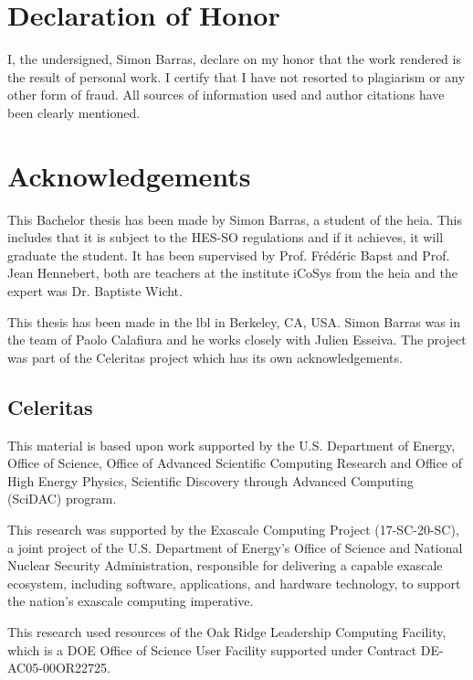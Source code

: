 \chapter{Declaration of Honor}
\label{ch:honour}
I, the undersigned, Simon Barras, declare on my honor that the work rendered is the result of
personal work. I certify that I have not resorted to plagiarism or any other form of fraud.
All sources of information used and author citations have been clearly mentioned.



\chapter{Acknowledgements}
\label{ch:remerciement}

This Bachelor thesis has been made by Simon Barras, a student of the \acrlong{heia}.
This includes that it is subject to the HES-SO regulations and if it achieves, it
will graduate the student.
It has been supervised by Prof. Frédéric Bapst and Prof. Jean Hennebert, both
are teachers at the institute iCoSys from the \acrshort{heia} and the expert was Dr. Baptiste Wicht.

This thesis has been made in the \acrlong{lbl} in Berkeley, CA, USA.
Simon Barras was in the team of Paolo Calafiura and he works closely with Julien
Esseiva.
The project was part of the Celeritas project which has its own acknowledgements.

\section{Celeritas}
\label{ch:acknowledgements:celeritas}

This material is based upon work supported by the U.S. Department of Energy,
Office of Science, Office of Advanced Scientific Computing Research and Office
of High Energy Physics, Scientific Discovery through Advanced Computing (SciDAC)
program.

This research was supported by the Exascale Computing Project (17-SC-20-SC), a
joint project of the U.S. Department of Energy's Office of Science and National
Nuclear Security Administration, responsible for delivering a capable exascale
ecosystem, including software, applications, and hardware technology, to support
the nation's exascale computing imperative.

This research used resources of the Oak Ridge Leadership Computing Facility,
which is a DOE Office of Science User Facility supported under Contract
DE-AC05-00OR22725.

